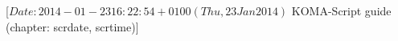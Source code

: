 %
%
%
%
%
%
%
%
% 
%
%
%
%

                 [$Date: 2014-01-23 16:22:54 +0100 (Thu, 23 Jan 2014) $
                  KOMA-Script guide (chapter: scrdate, scrtime)]




